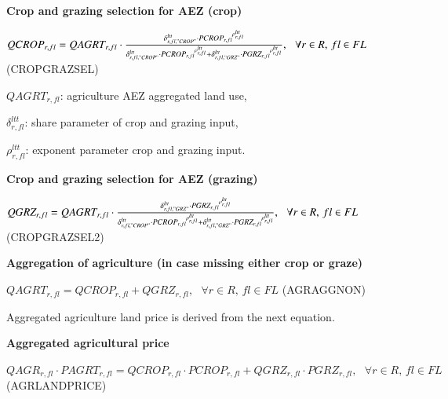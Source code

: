 \documentclass[10pt,a4paper,titlepage,dvipdfmx]{book}
\begin{document}
\begin{flushleft}\textbf{Crop and grazing selection for AEZ (crop)}\end{flushleft}


\begin{center}$QCROP_{r,fl}=QAGRT_{r,fl}\cdot \frac{\delta _{r,fl,"CROP"}^{ltt}\cdot PCRO{P_{r,fl}}^{\rho _{r,fl}^{ltt}}}{\delta _{r,fl,"CROP"}^{ltt}\cdot PCRO{P_{r,fl}}^{\rho _{r,fl}^{ltt}}+\delta _{r,fl,"GRZ"}^{ltt}\cdot PGR{Z_{r,fl}}^{\rho _{r,fl}^{ltt}}},\,\,\,\,\forall r\in R,\,fl\in FL$ (CROPGRAZSEL)
\end{center}

\begin{flushleft}
$QAGRT_{r,fl}$: agriculture AEZ aggregated land use,

$\delta _{r,fl}^{ltt}$: share parameter of crop and grazing input,

$\rho _{r,fl}^{ltt}$: exponent parameter crop and grazing input.
\end{flushleft}

\begin{flushleft}\textbf{Crop and grazing selection for AEZ (grazing)}\end{flushleft}


\begin{center}$QGRZ_{r,fl}=QAGRT_{r,fl}\cdot \frac{\delta _{r,fl,"GRZ"}^{ltt}\cdot PGR{Z_{r,fl}}^{\rho _{r,fl}^{ltt}}}{\delta _{r,fl,"CROP"}^{ltt}\cdot PCRO{P_{r,fl}}^{\rho _{r,fl}^{ltt}}+\delta _{r,fl,"GRZ"}^{ltt}\cdot PGR{Z_{r,fl}}^{\rho _{r,fl}^{ltt}}},\,\,\,\,\forall r\in R,\,fl\in FL$ (CROPGRAZSEL2)
\end{center}

\begin{flushleft}\textbf{Aggregation of agriculture (in case missing either crop or graze)}\end{flushleft}


\begin{center}$QAGRT_{r,fl}=QCROP_{r,fl}+QGRZ_{r,fl},\,\,\,\,\forall r\in R,\,fl\in FL$ (AGRAGGNON)
\end{center}

Aggregated agriculture land price is derived from the next equation.

\begin{flushleft}\textbf{Aggregated agricultural price}\end{flushleft}


\begin{center}$QAGR_{r,fl}\cdot PAGRT_{r,fl}=QCROP_{r,fl}\cdot PCROP_{r,fl}+QGRZ_{r,fl}\cdot PGRZ_{r,fl},\,\,\,\,\forall r\in R,\,fl\in FL$ (AGRLANDPRICE)
\end{center}
\end{document}
